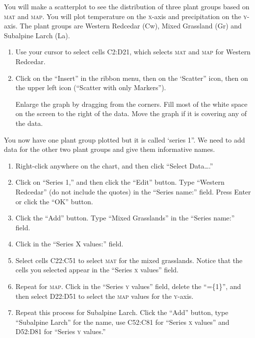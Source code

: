 \documentclass[12pt, hidelinks]{exam}
\newcommand*\axis[1]{{\scshape #1}-axis}
\begin{document}
\begin{questions}
You will make a scatterplot to see the distribution of three plant groups based on \textsc{mat} and \textsc{map}. You will plot temperature on the \axis{x} and precipitation on the \axis{y}. The plant groups are Western Redcedar (Cw), Mixed Grassland (Gr) and Subalpine Larch (La). 

\begin{enumerate}
	\item Use your cursor to select cells {\liningnum C2:D21}, which selects \textsc{mat} and \textsc{map} for Western Redcedar.

	\item Click on the “Insert” in the ribbon menu, then on the ‘Scatter” icon, then on the upper left icon (“Scatter with only Markers”).

	Enlarge the graph by dragging from the corners. Fill most of the white space on the screen to the right of the data. Move the graph if it is covering any of the data. 
\end{enumerate}

You now have one plant group plotted but it is called ‘series 1”. We need to add data for the other two plant groups and give them informative names. 

\begin{enumerate}[resume]
	\item Right-click anywhere on the chart, and then click “Select Data\dots.”

	\item Click on “Series 1,” and then click the “Edit” button. Type “Western Redcedar” (do not include the quotes) in the “Series name:” field. Press Enter or click the “OK” button.

	\item Click the “Add” button. Type “Mixed Grasslands” in the “Series name:” field.

	\item Click in the “Series X values:” field.

	\item Select cells {\liningnum C22:C51} to select \textsc{mat} for the mixed grasslands. Notice that the cells you selected appear in the “Series \textsc{x} values” field.

	\item Repeat for \textsc{map}. Click in the “Series \textsc{y} values” field, delete the “=\{1\}”, and then select {\liningnum D22:D51} to select the \textsc{map} values for the \axis{y}. 

	\item Repeat this process for Subalpine Larch. Click the “Add” button, type “Subalpine Larch” for the name, use {\liningnum C52:C81} for “Series \textsc{x} values” and D52:D81 for “Series \textsc{y} values.” 


\end{enumerate}
\end{questions}
\end{document}
